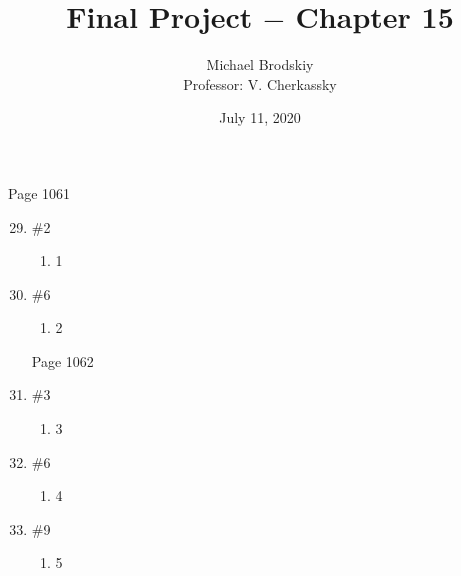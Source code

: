 \documentclass[12pt]{article}
\title{Final Project $-$ Chapter 15}
\date{July 11, 2020}
\author{Michael Brodskiy\\ \small Professor: V. Cherkassky}
\begin{document}
\maketitle

\begin{center}

Page 1061

\end{center}

\begin{enumerate}

\setcounter{enumi}{28}

  \item \#2 \begin{enumerate}

		\item 1

    \end{enumerate}

  \item \#6 \begin{enumerate}

      \item 2

    \end{enumerate}

    \begin{center}

Page 1062

    \end{center}

    \item \#3

    \begin{enumerate}

      \item 3

    \end{enumerate}


    \item \#6 \begin{enumerate}

        \item 4 

\end{enumerate}

    \item \#9 \begin{enumerate}

        \item 5

    \end{enumerate}


\end{enumerate}
\end{document}
